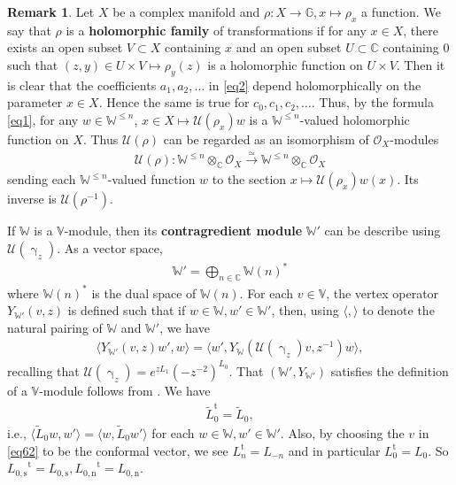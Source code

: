 \documentclass[12pt,a4paper,notitlepage]{article}
\theoremstyle{definition}
\newtheorem{rem}[df]{Remark}
\theoremstyle{plain}
\newcommand{\mc}{\mathcal}
\newcommand{\wtd}{\widetilde}
\newcommand{\tr}{\mathrm{t}} %
\newcommand{\bk}[1]{\langle {#1}\rangle}
\newcommand{\scr}{\mathscr}
\newcommand{\mbb}{\mathbb}
\newcommand{\Vbb}{\mathbb V}
\newcommand{\Wbb}{\mathbb W}
\newcommand{\Cbb}{\mathbb C}
\newcommand{\Lss}{{L_{0,\mathrm{s}}}}
\newcommand{\Lni}{{L_{0,\mathrm{n}}}}
\numberwithin{equation}{section}
\begin{document}
\begin{rem}\label{lb2}
Let $X$ be a complex manifold and $\rho:X\rightarrow\mbb G,x\mapsto \rho_x$ a function. We say that $\rho$ is a \textbf{holomorphic family} of transformations if for any $x\in X$, there exists an open subset $V\subset X$ containing $x$ and an open subset $U\subset\Cbb$ containing $0$ such that  $(z,y)\in U\times V\mapsto \rho_y(z)$ is a holomorphic function on $U\times V$. Then it is clear that the coefficients $a_1,a_2,\dots$ in \eqref{eq2} depend holomorphically on the parameter $x\in X$. Hence the same is true for $c_0,c_1,c_2,\dots$. Thus, by the formula \eqref{eq1}, for any $w\in\Wbb^{\leq n}$, $x\in X\mapsto \mc U(\rho_x)w$ is a $\Wbb^{\leq n}$-valued holomorphic function on $X$. Thus $\mc U(\rho)$ can be regarded as an isomorphism of  $\scr O_X$-modules 
\begin{align}
\mc U(\rho): \Wbb^{\leq n}\otimes_{\Cbb}\scr O_X\xrightarrow{\simeq}\Wbb^{\leq n}\otimes_{\Cbb}\scr O_X
\end{align}
sending each $\Wbb^{\leq n}$-valued function $w$ to the section $x\mapsto \mc U(\rho_x)w(x)$. \index{U@$\mc U(\rho)$} Its inverse is  $\mc U(\rho^{-1})$.
\end{rem}







If $\Wbb$ is a $\Vbb$-module, then its \textbf{contragredient module} $\Wbb'$ \index{W'@$\Wbb'$} can be describe using $\mc U(\upgamma_z)$. As a vector space,
\begin{align*}
\Wbb'=\bigoplus_{n\in\Cbb}\Wbb{(n)}^*
\end{align*}
where $\Wbb{(n)}^*$ is the dual space of $\Wbb{(n)}$. For each $v\in\Vbb$, the vertex operator $Y_{\Wbb'}(v,z)$ is defined such that if $w\in\Wbb,w'\in\Wbb'$, then, using $\bk{,}$ to denote the natural pairing of $\Wbb$ and $\Wbb'$, we have 
\begin{align}
\bk{Y_{\Wbb'}(v,z)w',w}=\bk{w',Y_\Wbb(\mc U(\upgamma_z)v,z^{-1})w},\label{eq62}
\end{align}
recalling that $\mc U(\upgamma_z)=e^{zL_1}(-z^{-2})^{L_0}$. That  $(\Wbb',Y_{\Wbb'})$ satisfies the definition of a $\Vbb$-module follows from \cite{FHL93}. We have 
\begin{align}
	\wtd L_0^\tr=\wtd L_0,\label{eq99}
\end{align}
i.e., $\bk{\wtd L_0w,w'}=\bk{w,\wtd L_0w'}$ for each $w\in\Wbb,w'\in\Wbb'$. Also, by choosing the $v$ in \eqref{eq62} to be the conformal vector, we see $L_n^\tr=L_{-n}$ and in particular $L_0^\tr=L_0$. So $\Lss^\tr=\Lss,\Lni^\tr=\Lni$.
\end{document}
